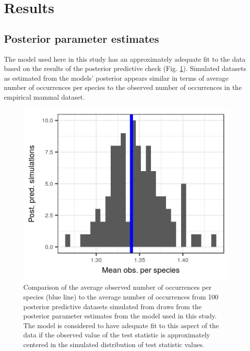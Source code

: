 \documentclass[12pt,letterpaper]{article}
\begin{document}
\section*{Results}


\subsection*{Posterior parameter estimates}


The model used here in this study has an approximately adequate fit to the data based on the results of the posterior predictive check (Fig. \ref{fig:ppc}). Simulated datasets as estimated from the models' posterior appears similar in terms of average number of occurrences per species to the observed number of occurrences in the empirical mammal dataset.
\begin{figure}[ht]
  \centering
  \includegraphics[width=\textwidth,height=0.3\textheight,keepaspectratio=true]{figure/pred_occ_bd}
  \caption[Posterior predictive check of average occurrence]{Comparison of the average observed number of occurrences per species (blue line) to the average number of occurrences from 100 posterior predictive datasets simulated from draws from the posterior parameter estimates from the model used in this study. The model is considered to have adequate fit to this aspect of the data if the observed value of the test statistic is approximately centered in the simulated distribution of test statistic values.}
  \label{fig:ppc}
\end{figure}
\end{document}
